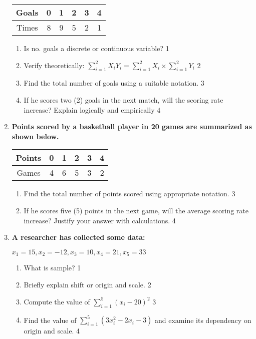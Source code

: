 \documentclass[a4paper,oneside]{book}
\begin{document}
\begin{enumerate}
	  \begin{table}[h]
	  \centering
\begin{tabular}{|c|ccccc|}
Goals & 0 & 1 & 2 & 3 & 4 \\ \hline
Times & 8 & 9 & 5 & 2 & 1
\end{tabular}
\end{table}
  
  \begin{enumerate}
    \item
	Is no. goals a discrete or continuous variable? \hfill 1
    \item
	Verify theoretically: $\displaystyle \sum_{i=1}^{2} X_iY_i = \sum_{i=1}^{2} X_i \times \sum_{i=1}^{2} Y_i$ \hfill 2
    \item  
	Find the total number of goals using a suitable notation. \hfill 3
    \item
	If he scores two (2) goals in the next match, will the scoring rate increase? Explain logically and empirically \hfill 4
  \end{enumerate}
  
  \item
\textbf{Points scored by a basketball player in 20 games are summarized as shown below.}

\begin{table}[h]
\centering
\begin{tabular}{|c|ccccc|}
Points & 0 & 1 & 2 & 3 & 4 \\ \hline
Games  & 4 & 6 & 5 & 3 & 2
\end{tabular}
\end{table}

\begin{enumerate}
    \item  
    Find the total number of points scored using appropriate notation. \hfill 3
    \item
    If he scores five (5) points in the next game, will the average scoring rate increase? Justify your answer with calculations. \hfill 4
\end{enumerate}

  
     \item
	  \textbf{A researcher has collected some data:}
	  \begin{center}
	  $x_1=15, x_2=-12, x_3=10, x_4=21, x_5=33$
  \end{center}
  \begin{enumerate}
    \item
	What is sample? \hfill 1
    \item
	Briefly explain shift or origin and scale. \hfill 2
    \item  
	Compute the value of $\displaystyle \sum_{i=1}^5 (x_i-20)^2$ \hfill 3
    \item
	Find the value of $\displaystyle \sum_{i=1}^5 (3x_i^2-2x_i-3)$ and examine its dependency on origin and scale. \hfill 4
  \end{enumerate} 
  

\end{enumerate}
\end{document}
